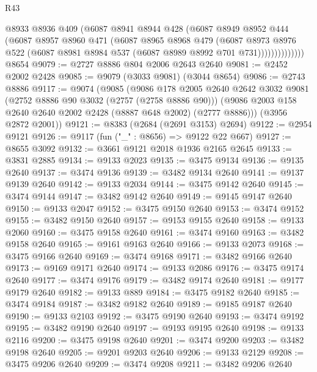 \begin{lexlean}{R43}
\begin{coremodule}
                  @8933
                  @8936
                  @409
                  (@6087
                    @8941
                    @8944
                    @428
                    (@6087
                      @8949
                      @8952
                      @444
                      (@6087
                        @8957
                        @8960
                        @471
                        (@6087
                          @8965
                          @8968
                          @479
                          (@6087
                            @8973
                            @8976
                            @522
                            (@6087 @8981 @8984 @537 (@6087 @8989 @8992 @701 @731))))))))))))))
    @8654
@9079 := @2727 @8886 @804 @2006 @2643 @2640
@9081 := @2452 @2002 @2428
@9085 := @9079 (@3033 @9081) (@3044 @8654)
@9086 := @2743 @8886
@9117 := @9074
    (@9085
      (@9086
        @178
        @2005
        @2640
        @2642
        @3032
        @9081
        (@2752 @8886 @90 @3032 (@2757 (@2758 @8886 @90)))
        (@9086 @2003 @158 @2640 @2640 @2002 @2428 (@8887 @648 @2002) (@2777 @8886)))
      (@3956 @2872 @2001))
@9121 := @8383 (@2684 (@2691 @3153) @2694)
@9122 := @2954 @9121
@9126 := @9117 (fun ("_" : @8656) => @9122 @22 @667)
@9127 := @8655 @3092
@9132 := @3661 @9121 @2018 @1936 @2165 @2645
@9133 := @3831 @2885
@9134 := @9133 @2023
@9135 := @3475 @9134
@9136 := @9135 @2640
@9137 := @3474 @9136
@9139 := @3482 @9134 @2640
@9141 := @9137 @9139 @2640
@9142 := @9133 @2034
@9144 := @3475 @9142 @2640
@9145 := @3474 @9144
@9147 := @3482 @9142 @2640
@9149 := @9145 @9147 @2640
@9150 := @9133 @2047
@9152 := @3475 @9150 @2640
@9153 := @3474 @9152
@9155 := @3482 @9150 @2640
@9157 := @9153 @9155 @2640
@9158 := @9133 @2060
@9160 := @3475 @9158 @2640
@9161 := @3474 @9160
@9163 := @3482 @9158 @2640
@9165 := @9161 @9163 @2640
@9166 := @9133 @2073
@9168 := @3475 @9166 @2640
@9169 := @3474 @9168
@9171 := @3482 @9166 @2640
@9173 := @9169 @9171 @2640
@9174 := @9133 @2086
@9176 := @3475 @9174 @2640
@9177 := @3474 @9176
@9179 := @3482 @9174 @2640
@9181 := @9177 @9179 @2640
@9182 := @9133 @889
@9184 := @3475 @9182 @2640
@9185 := @3474 @9184
@9187 := @3482 @9182 @2640
@9189 := @9185 @9187 @2640
@9190 := @9133 @2103
@9192 := @3475 @9190 @2640
@9193 := @3474 @9192
@9195 := @3482 @9190 @2640
@9197 := @9193 @9195 @2640
@9198 := @9133 @2116
@9200 := @3475 @9198 @2640
@9201 := @3474 @9200
@9203 := @3482 @9198 @2640
@9205 := @9201 @9203 @2640
@9206 := @9133 @2129
@9208 := @3475 @9206 @2640
@9209 := @3474 @9208
@9211 := @3482 @9206 @2640

\end{coremodule}
\end{lexlean}
